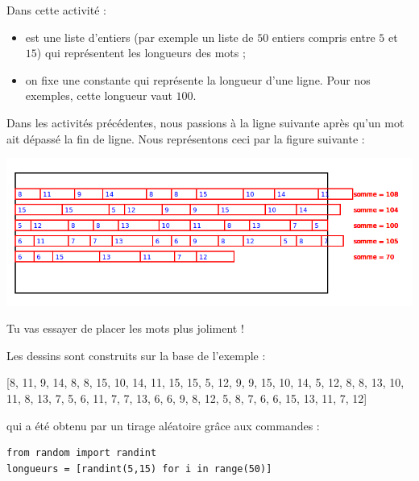 \documentclass[11pt,class=report,crop=false]{standalone}
\begin{document}
\begin{activite}[Justification]



Dans cette activité :
\begin{itemize}
 \item  {} est une liste d'entiers (par exemple un liste de $50$ entiers compris entre $5$ et $15$) qui représentent les longueurs des mots ;
 \item on fixe une constante  qui représente la longueur d'une ligne. Pour nos exemples, cette longueur vaut $100$.
 \end{itemize}


Dans les activités précédentes, nous passions à la ligne suivante après qu'un mot ait dépassé la fin de ligne.
Nous représentons ceci par la figure suivante :
\begin{center}
\includegraphics[scale=0.5]{ecran-coupures-1}
\end{center} 
Tu vas essayer de placer les mots plus joliment !

Les dessins sont construits sur la base de l'exemple :
\begin{center}
 [8, 11, 9, 14, 8, 8, 15, 10, 14, 11, 15, 15, 5, 12, 9, 9, 15, 10, 14, 5, 12, 8, 8, 13, 10, 11, 8, 13, 7, 5, 6, 11, 7, 7, 13, 6, 6, 9, 8, 12, 5, 8, 7, 6, 6, 15, 13, 11, 7, 12]
\end{center}

qui a été obtenu par un tirage aléatoire grâce aux commandes :\\
\begin{lstlisting}
from random import randint
longueurs = [randint(5,15) for i in range(50)]
\end{lstlisting}



\end{activite}
\end{document}
